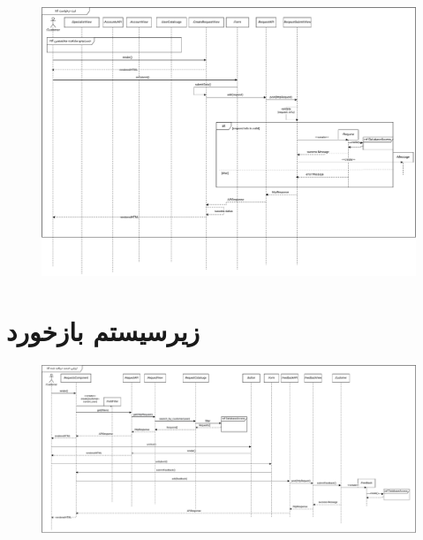 \eject \pdfpagewidth=15in \pdfpageheight=12in

\begin{figure}[ht!]
	\centering
	\includegraphics[scale=0.8]{figs/design-sequence/3-18.pdf}
\end{figure}
\FloatBarrier
\newpage



\eject \pdfpagewidth=13in \pdfpageheight=10in

\section{زیرسیستم بازخورد}

\eject \pdfpagewidth=17in \pdfpageheight=8in

\begin{figure}[ht!]
	\centering
	\includegraphics[scale=0.8]{figs/design-sequence/3-24.pdf}
\end{figure}
\FloatBarrier
\newpage

